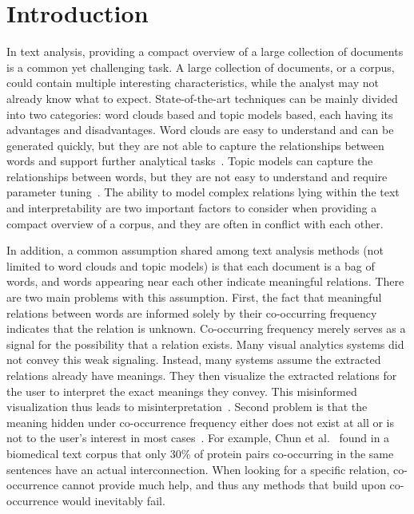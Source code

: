 \section{Introduction}
% 
In text analysis, providing a compact overview of a large collection of documents is a common yet challenging task.
A large collection of documents, or a corpus, could contain multiple interesting characteristics, while the analyst may not already know what to expect.
State-of-the-art techniques can be mainly divided into two categories: word clouds based and topic models based, each having its advantages and disadvantages.
Word clouds are easy to understand and can be generated quickly, but they are not able to capture the relationships between words and support further analytical tasks~\cite{viegas2008timelines}.
Topic models can capture the relationships between words, but they are not easy to understand and require parameter tuning~\cite{chuang2013topicdiagnostic}.
The ability to model complex relations lying within the text and interpretability are two important factors to consider when providing a compact overview of a corpus, and they are often in conflict with each other.

In addition, a common assumption shared among text analysis methods (not limited to word clouds and topic models) is that each document is a bag of words, and words appearing near each other indicate meaningful relations.
There are two main problems with this assumption.
First, the fact that meaningful relations between words are informed solely by their co-occurring frequency indicates that the relation is unknown.
Co-occurring frequency merely serves as a signal for the possibility that a relation exists.
Many visual analytics systems did not convey this weak signaling. 
Instead, many systems assume the extracted relations already have meanings.
They then visualize the extracted relations for the user to interpret the exact meanings they convey.
This misinformed visualization thus leads to misinterpretation~\cite{lee2017human}.
Second problem is that the meaning hidden under co-occurrence frequency either does not exist at all or is not to the user's interest in most cases~\cite{EESurveyBiomed}.
For example, Chun et al.~\cite{chun2006extraction} found in a biomedical text corpus that only 30\% of protein pairs co-occurring in the same sentences have an actual interconnection.
When looking for a specific relation, co-occurrence cannot provide much help, and thus any methods that build upon co-occurrence would inevitably fail.

